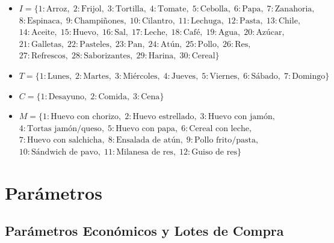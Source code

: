 \documentclass[12pt, letterpaper]{article}
\begin{document}
\begin{itemize}
  \item $I = \{1:\text{Arroz},\; 2:\text{Frijol},\; 3:\text{Tortilla},\; 4:\text{Tomate},\; 5:\text{Cebolla},\; 6:\text{Papa},\; 7:\text{Zanahoria},\;$\\
        $8:\text{Espinaca},\; 9:\text{Champiñones},\; 10:\text{Cilantro},\; 11:\text{Lechuga},\; 12:\text{Pasta},\; 13:\text{Chile},\;$\\
        $14:\text{Aceite},\; 15:\text{Huevo},\; 16:\text{Sal},\; 17:\text{Leche},\; 18:\text{Café},\; 19:\text{Agua},\; 20:\text{Azúcar},\;$\\
        $21:\text{Galletas},\; 22:\text{Pasteles},\; 23:\text{Pan},\; 24:\text{Atún},\; 25:\text{Pollo},\; 26:\text{Res},\;$\\
        $27:\text{Refrescos},\; 28:\text{Saborizantes},\; 29:\text{Harina},\; 30:\text{Cereal}\}$

  \item $T = \{1:\text{Lunes},\; 2:\text{Martes},\; 3:\text{Miércoles},\; 4:\text{Jueves},\; 5:\text{Viernes},\; 6:\text{Sábado},\; 7:\text{Domingo}\}$

  \item $C = \{1:\text{Desayuno},\; 2:\text{Comida},\; 3:\text{Cena}\}$

  \item $M = \{1:\text{Huevo con chorizo},\; 2:\text{Huevo estrellado},\; 3:\text{Huevo con jamón},\;$\\
        $4:\text{Tortas jamón/queso},\; 5:\text{Huevo con papa},\; 6:\text{Cereal con leche},\;$\\
        $7:\text{Huevo con salchicha},\; 8:\text{Ensalada de atún},\; 9:\text{Pollo frito/pasta},\;$\\
        $10:\text{Sándwich de pavo},\; 11:\text{Milanesa de res},\; 12:\text{Guiso de res}\}$
\end{itemize}

\section{Parámetros}

\subsection{Parámetros Económicos y Lotes de Compra}
\end{document}
